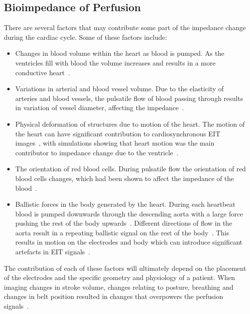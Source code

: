 \subsection{Bioimpedance of Perfusion} \label{sec:origins}
There are several factors that may contribute some part of 
the impedance change during the cardiac cycle. 
Some of these factors include:
\begin{itemize}
    \item Changes in blood volume within the heart as blood is pumped. As the ventricles 
          fill with blood
          the volume increases and results in a more conductive
          heart~\parencite{nyboer_impedance_1970}.
    \item Variations in arterial and blood vessel volume. Due to the elasticity of arteries 
          and
          blood vessels, the pulsatile flow of blood passing through results in variation of 
          vessel diameter, affecting the impedance~\parencite{eyuboglu_localisation_1987}.
    \item Physical deformation of structures due to motion of the heart. The
          motion of the heart can have significant contribution 
          to cardiosynchronous EIT 
          images~\parencite{proenca_influence_2015,adler_origins_2017}, 
          with simulations showing that heart motion was the 
          main contributor to impedance change due to the 
          ventricle~\parencite{proenca_influence_2015}. 
    \item The orientation of red blood cells. During pulsatile flow the orientation of
          red blood cells changes, which had been shown to affect the impedance of the 
          blood~\parencite{gaw_effect_2010}. 
    \item Ballistic forces in the body generated by the heart. During each
          heartbeat blood is pumped downwards through the descending
          aorta with a large force pushing the rest of the body 
          upwards~\parencite{gordon_certain_1877}. Different directions 
          of flow in the aorta result in a repeating ballistic 
          signal on the rest of the body~\parencite{kim_ballistocardiogram_2016}. This results in 
          motion on the electrodes and body which can introduce significant
          artefacts in EIT signals~\parencite{adler_impedance_1994}.
\end{itemize}

The contribution of each of these factors will ultimately depend on the placement
of the electrodes and the specific geometry and physiology of a patient. 
When imaging changes in stroke volume, changes 
relating to posture, breathing and changes in belt 
position resulted in  changes that overpowers the 
perfusion signals~\parencite{patterson_variability_2001}.  

